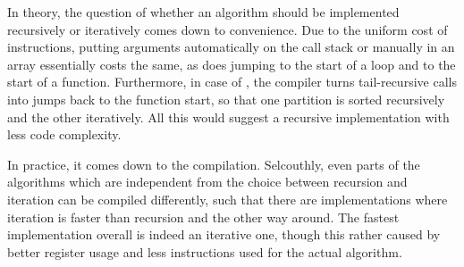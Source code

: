 %

In theory, the question of whether an algorithm should be implemented recursively or iteratively comes down to convenience.
Due to the uniform cost of instructions, putting arguments automatically on the call stack or manually in an array essentially costs the same, as does jumping to the start of a loop and to the start of a function.
Furthermore, in case of \QS{}, the compiler turns tail-recursive calls into jumps back to the function start, so that one partition is sorted recursively and the other iteratively.
All this would suggest a recursive implementation with less code complexity.

In practice, it comes down to the compilation.
Selcouthly, even parts of the algorithms which are independent from the choice between recursion and iteration can be compiled differently, such that there are implementations where iteration is faster than recursion and the other way around.
The fastest implementation overall is indeed an iterative one, though this rather caused by better register usage and less instructions used for the actual \QS{} algorithm.


